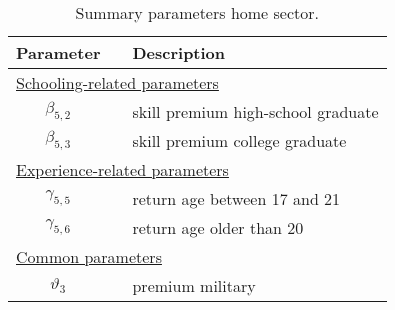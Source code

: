 \begin{table}[h]
\caption{Summary parameters home sector.}
\label{tab:ParametersHome}
\vspace{5pt}
\centering
\setlength\extrarowheight{2.5pt}
\begin{tabular}{@{}cll@{}}
\toprule
Parameter            &  &  \multicolumn{1}{l}{Description}              \\ \midrule
\multicolumn{3}{l}{\underline{Schooling-related parameters}}            \\[5pt]
$\beta_{5,2}$        &  & skill premium high-school graduate            \\
$\beta_{5,3}$        &  & skill premium college graduate                \\[7.5pt]
\multicolumn{3}{l}{\underline{Experience-related parameters}}           \\[5pt]
$\gamma_{5,5}$       &  & return age between 17 and 21                  \\
$\gamma_{5,6}$       &  & return age older than 20                      \\[7.5pt]
\multicolumn{3}{l}{\underline{Common parameters}}                \\[5pt]
$\vartheta_3$        &  & premium military                              \\[7.5pt]
\bottomrule
\end{tabular}
\end{table}
